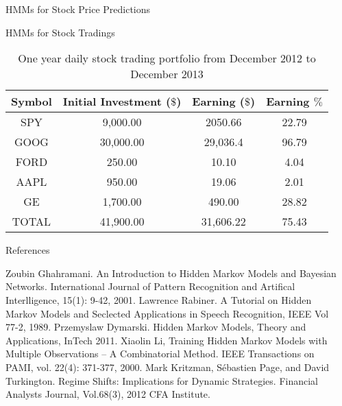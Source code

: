 \documentclass[final]{beamer}
\newlength{\sepwid}
\newlength{\onecolwid}
\begin{document}
\begin{frame}[t]
\begin{columns}[t]
\begin{column}{\onecolwid}
\begin{block}{HMMs for Stock Price Predictions}
\end{block}

          \begin{block}{HMMs for Stock Tradings}
\begin{table}[h]\label{b1}
 \centering
 \begin{tabular}{c|c|c|c}
  \hline
  Symbol & Initial Investment ($\$$)& Earning ($\$$)&  Earning $\%$\\
 \hline
  \hline
  SPY  &9,000.00 &2050.66 &22.79\\
  \hline
  GOOG &30,000.00& 29,036.4& 96.79\\
  \hline
  FORD& 250.00 & 10.10& 4.04\\
  \hline
   AAPL& 950.00 & 19.06& 2.01\\
  \hline
   GE & 1,700.00& 490.00&28.82\\
  \hline
  \hline
  TOTAL&41,900.00&31,606.22&75.43\\
  \hline
\end{tabular}
\caption{One year daily stock trading portfolio from December 2012 to December 2013}
\label{ziggurat}
\end{table}
          \end{block}
          \begin{block}{References}	
            \small{\begin{thebibliography}{99}
		    Zoubin Ghahramani. An Introduction to Hidden Markov Models and Bayesian Networks. International Journal of Pattern Recognition and Artifical Interlligence, 15(1): 9-42, 2001.
\bibitem{} Lawrence Rabiner. A Tutorial on Hidden Markov Models and Seclected Applications in Speech Recognition, IEEE Vol 77-2, 1989.
\bibitem{} Przemyslaw Dymarski. Hidden Markov Models, Theory and Applications, InTech 2011.
\bibitem{} Xiaolin Li, Training Hidden Markov Models with Multiple Observations – A Combinatorial Method. IEEE Transactions on PAMI, vol. 22(4): 371-377, 2000.
\bibitem{} Mark Kritzman, Sébastien Page, and David Turkington. Regime Shifts: Implications for
Dynamic Strategies. Financial Analysts Journal, Vol.68(3), 2012 CFA Institute.
		        \end{thebibliography}}
		      \end{block}
    \end{column}
  \begin{column}{\sepwid}\end{column}			%
 \end{columns}
\end{frame}
\end{document}
